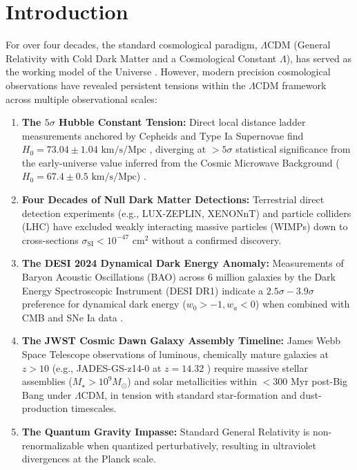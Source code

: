 \documentclass[aps,prd,reprint,superscriptaddress,nofootinbib,floatfix,amsmath,amssymb]{revtex4-2}
\begin{document}

\maketitle

\section{Introduction}
\label{sec:intro}

For over four decades, the standard cosmological paradigm, $\Lambda\text{CDM}$ (General Relativity with Cold Dark Matter and a Cosmological Constant $\Lambda$), has served as the working model of the Universe \cite{Planck2018_Cosmology}. However, modern precision cosmological observations have revealed persistent tensions within the $\Lambda\text{CDM}$ framework across multiple observational scales:

\begin{enumerate}
    \item \textbf{The $5\sigma$ Hubble Constant Tension:} Direct local distance ladder measurements anchored by Cepheids and Type Ia Supernovae find $H_0 = 73.04 \pm 1.04\text{ km/s/Mpc}$ \cite{Riess2022_SH0ES,PantheonPlus2022}, diverging at $>5\sigma$ statistical significance from the early-universe value inferred from the Cosmic Microwave Background ($H_0 = 67.4 \pm 0.5\text{ km/s/Mpc}$) \cite{Planck2018_Cosmology}.
    \item \textbf{Four Decades of Null Dark Matter Detections:} Terrestrial direct detection experiments (e.g., LUX-ZEPLIN, XENONnT) and particle colliders (LHC) have excluded weakly interacting massive particles (WIMPs) down to cross-sections $\sigma_{\text{SI}} < 10^{-47}\text{ cm}^2$ without a confirmed discovery.
    \item \textbf{The DESI 2024 Dynamical Dark Energy Anomaly:} Measurements of Baryon Acoustic Oscillations (BAO) across 6 million galaxies by the Dark Energy Spectroscopic Instrument (DESI DR1) indicate a $2.5\sigma - 3.9\sigma$ preference for dynamical dark energy ($w_0 > -1, w_a < 0$) when combined with CMB and SNe Ia data \cite{DESI2024_BAO}.
    \item \textbf{The JWST Cosmic Dawn Galaxy Assembly Timeline:} James Webb Space Telescope observations of luminous, chemically mature galaxies at $z > 10$ (e.g., JADES-GS-z14-0 at $z=14.32$ \cite{Carniani2024_JADES}) require massive stellar assemblies ($M_\star > 10^9 M_\odot$) and solar metallicities within $<300\text{ Myr}$ post-Big Bang under $\Lambda\text{CDM}$, in tension with standard star-formation and dust-production timescales.
    \item \textbf{The Quantum Gravity Impasse:} Standard General Relativity is non-renormalizable when quantized perturbatively, resulting in ultraviolet divergences at the Planck scale.
\end{enumerate}
\end{document}

